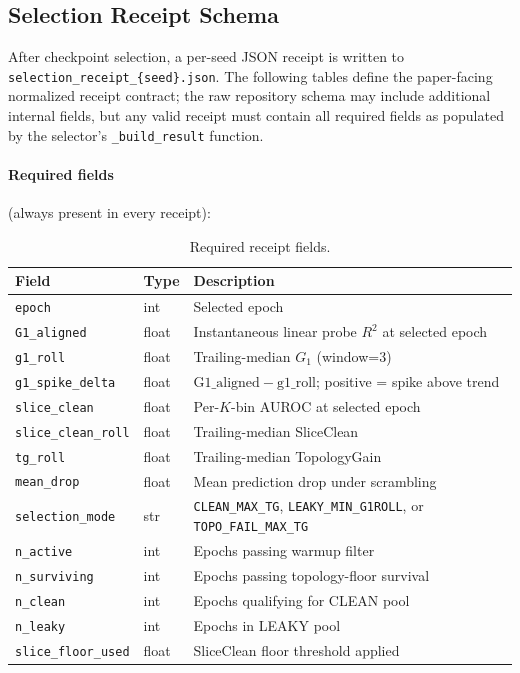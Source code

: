 \subsection{Selection Receipt Schema}

After checkpoint selection, a per-seed JSON receipt is written to \texttt{selection\_receipt\_\{seed\}.json}. The following tables define the paper-facing normalized receipt contract; the raw repository schema may include additional internal fields, but any valid receipt must contain all required fields as populated by the selector's \texttt{\_build\_result} function.

\paragraph{Required fields} (always present in every receipt):

\begin{table}
\caption{Required receipt fields.}
\begin{ruledtabular}
\begin{tabular}{lll}
Field & Type & Description \\
\hline
\texttt{epoch} & int & Selected epoch \\
\texttt{G1\_aligned} & float & Instantaneous linear probe $R^2$ at selected epoch \\
\texttt{g1\_roll} & float & Trailing-median $G_1$ (window=3) \\
\texttt{g1\_spike\_delta} & float & $\mathrm{G1\_aligned} - \mathrm{g1\_roll}$; positive = spike above trend \\
\texttt{slice\_clean} & float & Per-$K$-bin AUROC at selected epoch \\
\texttt{slice\_clean\_roll} & float & Trailing-median SliceClean \\
\texttt{tg\_roll} & float & Trailing-median TopologyGain \\
\texttt{mean\_drop} & float & Mean prediction drop under scrambling \\
\texttt{selection\_mode} & str & \texttt{CLEAN\_MAX\_TG}, \texttt{LEAKY\_MIN\_G1ROLL}, or \texttt{TOPO\_FAIL\_MAX\_TG} \\
\texttt{n\_active} & int & Epochs passing warmup filter \\
\texttt{n\_surviving} & int & Epochs passing topology-floor survival \\
\texttt{n\_clean} & int & Epochs qualifying for CLEAN pool \\
\texttt{n\_leaky} & int & Epochs in LEAKY pool \\
\texttt{slice\_floor\_used} & float & SliceClean floor threshold applied \\
\end{tabular}
\end{ruledtabular}
\end{table}


